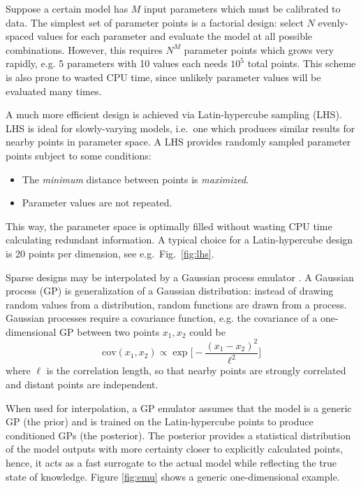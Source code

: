 \documentclass[reprint,amsmath]{revtex4-1}
\begin{document}
Suppose a certain model has $M$ input parameters which must be calibrated to data.  The simplest set of parameter points is a factorial
design:  select $N$ evenly-spaced values for each parameter and evaluate the model at all possible combinations.  However, this requires
$N^M$ parameter points which grows very rapidly, e.g. 5 parameters with 10 values each needs $10^5$ total points.  This scheme is also prone
to wasted CPU time, since unlikely parameter values will be evaluated many times.

A much more efficient design is achieved via Latin-hypercube sampling (LHS).  LHS is ideal for slowly-varying models, i.e.\ one which
produces similar results for nearby points in parameter space.  A LHS provides randomly sampled parameter points subject to some conditions:
\begin{itemize}
  \item The \emph{minimum} distance between points is \emph{maximized}.
  \item Parameter values are not repeated.
\end{itemize}
This way, the parameter space is optimally filled without wasting CPU time calculating redundant information.  A typical choice for a
Latin-hypercube design is 20 points per dimension, see e.g.\ Fig.\ \ref{fig:lhs}.

Sparse designs may be interpolated by a Gaussian process emulator \cite{rasmussen}.  A Gaussian process (GP) is generalization of a
Gaussian distribution:  instead of drawing random values from a distribution, random functions are drawn from a process.  Gaussian processes
require a covariance function, e.g. the covariance of a one-dimensional GP between two points $x_1,x_2$ could be
\begin{equation}
  \text{cov}(x_1,x_2) \propto \exp \biggl[ -\frac{(x_1-x_2)^2}{\ell^2} \biggr] 
\end{equation}
where $\ell$ is the correlation length, so that nearby points are strongly correlated and distant points are independent.

When used for interpolation, a GP emulator assumes that the model is a generic GP (the prior) and is trained on the Latin-hypercube points
to produce conditioned GPs (the posterior).  The posterior provides a statistical distribution of the model outputs with more certainty
closer to explicitly calculated points, hence, it acts as a fast surrogate to the actual model while reflecting the true state of knowledge.
Figure \ref{fig:emu} shows a generic one-dimensional example.
\end{document}
